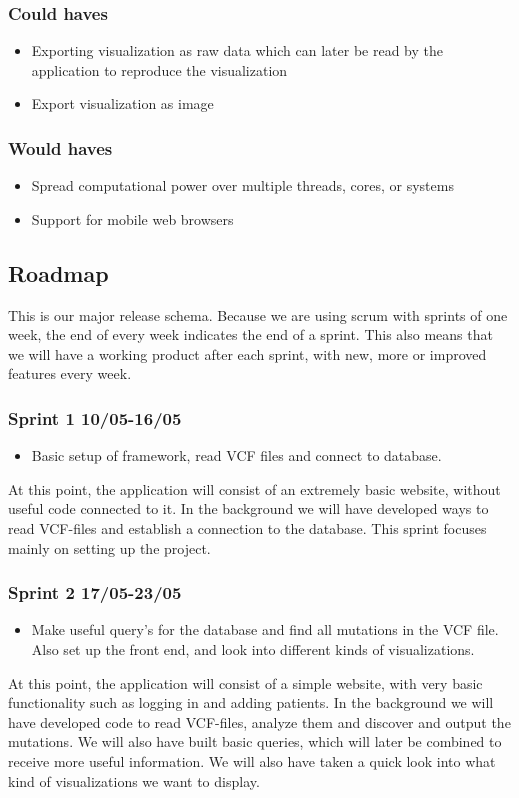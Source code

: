 	\subsubsection{Could haves}
		\begin{itemize}
			\item Exporting visualization as raw data which can later be read by the application to reproduce the visualization
			\item Export visualization as image
		\end{itemize}
	
	\subsubsection{Would haves}
		\begin{itemize}
			\item Spread computational power over multiple threads, cores, or systems
			\item Support for mobile web browsers
		\end{itemize}

\subsection{Roadmap}
	This is our major release schema. Because we are using scrum with sprints of one week, the end of every week indicates the end of a sprint. This also means that we will have a working product after each sprint, with new, more or improved features every week.

	\subsubsection*{Sprint 1 10/05-16/05}
		\begin{itemize}
			\item Basic setup of framework, read VCF files and connect to database.
		\end{itemize}		
		At this point, the application will consist of an extremely basic website, without useful code connected to it. In the background we will have developed ways to read VCF-files and establish a connection to the database. This sprint focuses mainly on setting up the project.
	
	\subsubsection*{Sprint 2 17/05-23/05}
		\begin{itemize}
			\item Make useful query's for the database and find all mutations in the VCF file. Also set up the front end, and look into different kinds of visualizations.
		\end{itemize}	
		At this point, the application will consist of a simple website, with very basic functionality such as logging in and adding patients. In the background we will have developed code to read VCF-files, analyze them and discover and output the mutations. We will also have built basic queries, which will later be combined to receive more useful information. We will also have taken a quick look into what kind of visualizations we want to display.
	
